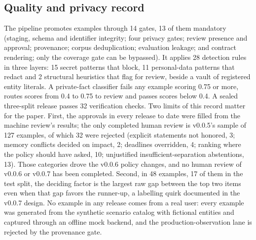 \subsection{Quality and privacy record}
The pipeline promotes examples through 14 gates, 13 of them mandatory (staging, schema and identifier integrity; four privacy gates; review presence and approval; provenance; corpus deduplication; evaluation leakage; and contract rendering; only the coverage gate can be bypassed). It applies 28 detection rules in three layers: 15 secret patterns that block, 11 personal-data patterns that redact and 2 structural heuristics that flag for review, beside a vault of registered entity literals. A private-fact classifier fails any example scoring 0.75 or more, routes scores from 0.4 to 0.75 to review and passes scores below 0.4. A sealed three-split release passes 32 verification checks. Two limits of this record matter for the paper. First, the approvals in every release to date were filled from the machine review's results; the only completed human review is v0.0.5's sample of 127 examples, of which 32 were rejected (explicit statements not honored, 3; memory conflicts decided on impact, 2; deadlines overridden, 4; ranking where the policy should have asked, 10; unjustified insufficient-separation abstentions, 13). Those categories drove the v0.0.6 policy changes, and no human review of v0.0.6 or v0.0.7 has been completed. Second, in 48 examples, 17 of them in the test split, the deciding factor is the largest raw gap between the top two items even when that gap favors the runner-up, a labelling quirk documented in the v0.0.7 design. No example in any release comes from a real user: every example was generated from the synthetic scenario catalog with fictional entities and captured through an offline mock backend, and the production-observation lane is rejected by the provenance gate.
